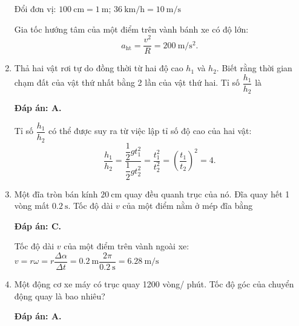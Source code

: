 \begin{enumerate}[label=\bfseries Câu \arabic*:]
{		Đổi đơn vị: $\SI{100}{\centi\meter}=\SI{1}{\meter}$; $\SI{36}{\kilo\meter/\hour}=\SI{10}{\meter/\second}$
		
		Gia tốc hướng tâm của một điểm trên vành bánh xe có độ lớn:
		$$a_\text{ht}=\dfrac{v^2}{R}=\SI{200}{\meter/\second^2}.$$
		
		
	}
	\item {}
	
	\cauhoi
	{Thả hai vật rơi tự do đồng thời từ hai độ cao $h_1$ và $h_2$. Biết rằng thời gian chạm đất của vật thứ nhất bằng 2 lần của vật thứ hai. Tỉ số $\dfrac{h_1}{h_2}$ là
	}
	\loigiai
	{\textbf{Đáp án: A.}
		
		Tỉ số $\dfrac{h_1}{h_2}$ có thể được suy ra từ việc lập tỉ số độ cao của hai vật: $$\dfrac{h_1}{h_2}=\dfrac{\dfrac{1}{2}gt_1^2}{\dfrac{1}{2}gt_2^2}=\dfrac{t_1^2}{t_2^2}=\left( \dfrac{t_1}{t_2}\right)^2=4.$$
		
		
	}
	\item {}
	
	\cauhoi
	{Một đĩa tròn bán kính $\SI{20}{\centi\meter}$ quay đều quanh trục của nó. Đĩa quay hết 1 vòng mất $\SI{0.2}{\second}$. Tốc độ dài $v$ của một điểm nằm ở mép đĩa bằng
		
	}
	\loigiai
	{\textbf{Đáp án: C.}
		
		Tốc độ dài $v$ của một điểm trên vành ngoài xe:
		$v=r\omega=r\dfrac{\Delta \alpha}{\Delta t}=\SI{0,2}{\meter}\dfrac{2\pi}{\SI{0.2}{\second}}=\SI{6,28}{\meter/\second}$
		
		
	}
	\item {}
	
	\cauhoi
	{Một động cơ xe máy có trục quay 1200 vòng/ phút. Tốc độ góc của chuyển động quay là bao nhiêu?
	}
	\loigiai
	{\textbf{Đáp án: A.}
		
}
\end{enumerate}
